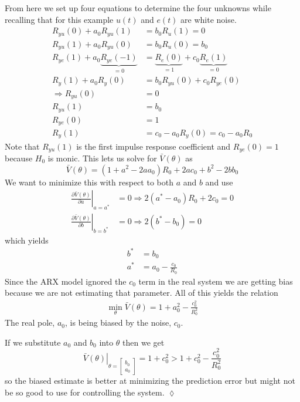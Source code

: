 \begin{example}
From here we set up four equations to determine the four unknowns while recalling that for this example $u(t)$ and $e(t)$ are white noise.
\begin{align*}
R_{yu}(0) + a_0R_{yu}(1) &= b_0R_u(1) = 0 \\
R_{yu}(1) + a_0R_{yu}(0) &= b_0R_u(0) = b_0 \\
R_{ye}(1) + a_0\underbrace{R_{ye}(-1)}_{=0} &= \underbrace{R_e(0)}_{=1} + c_0\underbrace{R_e(1)}_{=0} \\
R_y(1) + a_0R_y(0) &= b_0R_{yu}(0) + c_0R_{ye}(0) \\
\Rightarrow R_{yu}(0) &= 0 \\
R_{yu}(1) &= b_0 \\
R_{ye}(0) &= 1 \\
R_y(1) &= c_0-a_0R_y(0) = c_0-a_0R_0
\end{align*}
Note that $R_{yu}(1)$ is the first impulse response coefficient and $R_{ye}(0)=1$ because $H_0$ is monic. This lets us solve for $\bar{V}(\theta)$ as
$$\bar{V}(\theta) = (1+a^2-2aa_0)R_0+2ac_0 + b^2 - 2bb_0$$
We want to minimize this with respect to both $a$ and $b$ and use
\begin{align*}
\left.\frac{\partial\bar{V}(\theta)}{\partial a}\right|_{a=a^\ast} &= 0 \Rightarrow 2(a^\ast-a_0)R_0+2c_0=0 \\
\left.\frac{\partial\bar{V}(\theta)}{\partial b}\right|_{b=b^\ast} &= 0 \Rightarrow 2(b^\ast-b_0)=0
\end{align*}
which yields
\begin{align*}
b^\ast &= b_0 \\
a^\ast &= a_0-\frac{c_0}{R_0}
\end{align*}
Since the ARX model ignored the $c_0$ term in the real system we are getting bias because we are not estimating that parameter. All of this yields the relation
\begin{align*}
\boxed{\min_\theta\bar{V}(\theta) = 1+a_0^2-\frac{c_0^2}{R_0^2}}
\end{align*}
The real pole, $a_0$, is being biased by the noise, $c_0$.

If we substitute $a_0$ and $b_0$ into $\theta$ then we get
$$\left.\bar{V}(\theta)\right|_{\theta=\left[\begin{array}{c}b_0\\a_0\end{array}\right]} = 1+c_0^2 > 1+c_0^2-\frac{c_0^2}{R_0^2}$$
so the biased estimate is better at minimizing the prediction error but might not be so good to use for controlling the system.
$\lozenge$
\end{example}

